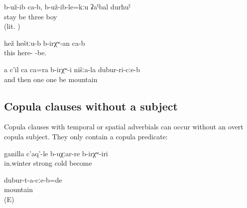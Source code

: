 \begin{exe}
		\ex	\label{ex:‎‎‎Once upon a time there were three boys}
	\gll	b-už-ib	ca-b,	b-už-ib-le=kːu	ʡaˁbal	durħuˁ\\
		stay		be	three	boy\\
	\glt	{} (lit. )
	
	 \ex	\label{This (picture) must be here.}	
\gll hež	heštːu-b	b-irχʷ-an	ca-b \\
this	here-	-be.	 \\
 \glt	{}
 
 	\ex	\label{ex:‎We had another thing in the mountains}
	\gll	a	c'il	ca	ca=ra	b-irχʷ-i	nišːa-la	dubur-ri-cːe-b\\
		and	then	one	one	be		mountain\\
	\glt	{}
 \end{exe}



\subsection{Copula clauses without a subject}
\label{ssec:Copula clauses without a subject}

Copula clauses with temporal or spatial adverbials can occur without an overt copula subject. They only contain a copula predicate:
%
\begin{exe}
	\ex	\label{ex:It used to be very cold in the winter}
	\gll	ganilla	c'aq'-le	b-uχːar-re	b-irχʷ-iri\\
		in.winter	strong	cold	become\\
	\glt	{}

	\ex	\label{ex:‎It was in the mountains.}
	\gll	dubur-t-a-cːe-b=de\\
		mountain\\
	\glt	{} (E)
\end{exe}

